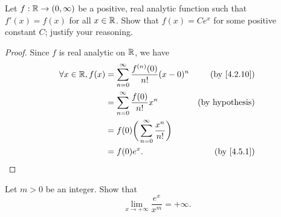 \begin{ex}\label{ex:4.5.7}
  Let \(f : \mathbb{R} \to (0, \infty)\) be a positive, real analytic function such that \(f'(x) = f(x)\) for all \(x \in \mathbb{R}\).
  Show that \(f(x) = C e^x\) for some positive constant \(C\);
  justify your reasoning.
\end{ex}

\begin{proof}
  Since \(f\) is real analytic on \(\mathbb{R}\), we have
  \begin{align*}
    \forall x \in \R, f(x) & = \sum_{n = 0}^\infty \frac{f^{(n)}(0)}{n!} (x - 0)^n & \text{(by \cref{4.2.10})} \\
                           & = \sum_{n = 0}^\infty \frac{f(0)}{n!} x^n             & \text{(by hypothesis)}    \\
                           & = f(0) \bigg(\sum_{n = 0}^\infty \frac{x^n}{n!}\bigg)                             \\
                           & = f(0) e^x.                                           & \text{(by \cref{4.5.1})}
  \end{align*}
\end{proof}

\begin{ex}\label{ex:4.5.8}
  Let \(m > 0\) be an integer.
  Show that
  \[
    \lim_{x \to +\infty} \frac{e^x}{x^m} = +\infty.
  \]
\end{ex}

